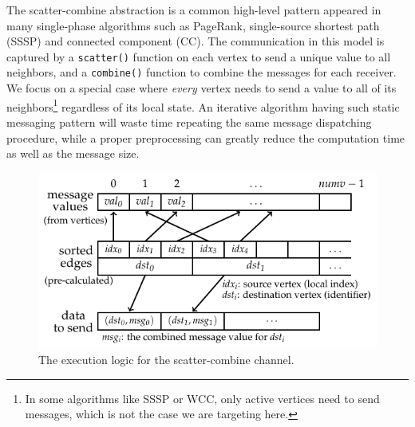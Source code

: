 \documentclass{sokendai_thesis} %
\begin{document}
The scatter-combine abstraction is a common high-level pattern appeared in many single-phase algorithms such as PageRank, single-source shortest path (SSSP) and connected component (CC).
The communication in this model is captured by a \texttt{scatter()} function on each vertex to send a unique value to all neighbors, and a \texttt{combine()} function to combine the messages for each receiver.
We focus on a special case where \textit{every} vertex needs to send a value to all of its neighbors\footnote{\small In some algorithms like SSSP or WCC, only active vertices need to send messages, which is not the case we are targeting here.} regardless of its local state.
An iterative algorithm having such static messaging pattern will waste time repeating the same message dispatching procedure, while a proper preprocessing can greatly reduce the computation time as well as the message size.


\begin{figure}[t]
 \centering
 \includegraphics[width=\textwidth]{figures/scatter-impl.pdf}
 \caption{The execution logic for the scatter-combine channel.}%
 \label{fig:scatter-impl}
\end{figure}
\end{document}
